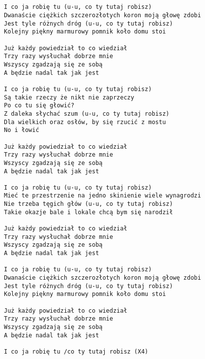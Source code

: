 \documentclass[12pt]{article}
\begin{document}
\subsection*{}
\begin{verbatim}
I co ja robię tu (u-u, co ty tutaj robisz)
Dwanaście ciężkich szczerozłotych koron moją głowę zdobi
Jest tyle różnych dróg (u-u, co ty tutaj robisz)
Kolejny piękny marmurowy pomnik koło domu stoi

Już każdy powiedział to co wiedział
Trzy razy wysłuchał dobrze mnie
Wszyscy zgadzają się ze sobą
A będzie nadal tak jak jest

I co ja robię tu (u-u, co ty tutaj robisz)
Są takie rzeczy że nikt nie zaprzeczy
Po co tu się głowić?
Z daleka słychać szum (u-u, co ty tutaj robisz)
Dla wielkich oraz osłów, by się rzucić z mostu
No i łowić

Już każdy powiedział to co wiedział
Trzy razy wysłuchał dobrze mnie
Wszyscy zgadzają się ze sobą
A będzie nadal tak jak jest

I co ja robię tu (u-u, co ty tutaj robisz)
Mieć te przestrzenie na jedno skinienie wiele wynagrodzi
Nie trzeba tęgich głów (u-u, co ty tutaj robisz)
Takie okazje bale i lokale chcą bym się narodził

Już każdy powiedział to co wiedział
Trzy razy wysłuchał dobrze mnie
Wszyscy zgadzają się ze sobą
A będzie nadal tak jak jest

I co ja robię tu (u-u, co ty tutaj robisz)
Dwanaście ciężkich szczerozłotych koron moją głowę zdobi
Jest tyle różnych dróg (u-u, co ty tutaj robisz)
Kolejny piękny marmurowy pomnik koło domu stoi

Już każdy powiedział to co wiedział
Trzy razy wysłuchał dobrze mnie
Wszyscy zgadzają się ze sobą
A będzie nadal tak jak jest

I co ja robię tu /co ty tutaj robisz (X4)
\end{verbatim}
\clearpage
\end{document}
